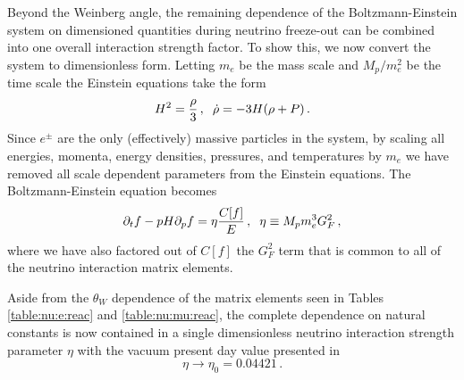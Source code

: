 Beyond the Weinberg angle, the remaining dependence of the Boltzmann-Einstein system on dimensioned quantities during neutrino freeze-out can be combined into one overall interaction strength factor. To show this, we now convert the system to dimensionless form. Letting $m_e$ be the mass scale and $M_p/m_e^2$ be the time scale the Einstein equations take the form
\begin{equation}
H^2=\frac{\rho}{3}\,,\hspace{2mm}\dot\rho=-3H(\rho+P)\,.
\end{equation}
Since $e^\pm$ are the only (effectively) massive particles in the system, by scaling all energies, momenta, energy densities, pressures, and temperatures by $m_e$ we have removed all scale dependent parameters from the Einstein equations. The Boltzmann-Einstein equation becomes
\begin{equation}\label{etaDef}
\partial_tf-pH\partial_pf=\eta\frac{C[f]}{E}\,,\hspace{2mm}\eta\equiv M_p m_e^3G_F^2\,,
\end{equation}
where we have also factored out of $C[f]$ the $G_F^2$ term that is common to all of the neutrino interaction matrix elements. 

Aside from the $\theta_W$ dependence of the matrix elements seen in Tables \ref{table:nu:e:reac} and \ref{table:nu:mu:reac}, the complete dependence on natural constants is now contained in a single dimensionless neutrino interaction strength parameter $\eta$ with the vacuum present day value presented in 
\begin{equation}\label{eta0Def}
\eta\to \eta_0 = 0.04421\, .
\end{equation}

